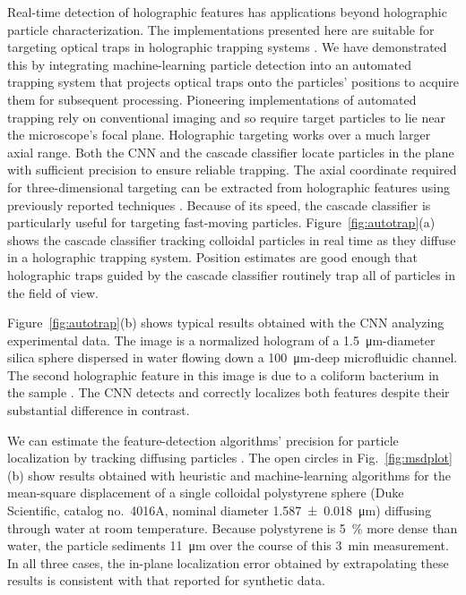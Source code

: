 Real-time detection of holographic features has applications
beyond holographic particle characterization.
The implementations presented here are suitable for targeting
optical traps in holographic trapping systems \cite{grier03}.
We have demonstrated this by integrating machine-learning
particle detection into an automated trapping system that
projects optical traps onto the particles' positions to acquire
them for subsequent processing.
Pioneering implementations
of automated trapping \cite{chapin06} rely on conventional
imaging and so require target particles to lie near the microscope's
focal plane.
Holographic targeting works over a much larger axial
range.
Both the CNN and the cascade classifier
locate particles in the plane with sufficient precision to ensure
reliable trapping.
The axial coordinate required for three-dimensional targeting can
be extracted from holographic features using previously reported
techniques \cite{yevick14}.
Because of its speed, the cascade classifier is particularly useful
for targeting fast-moving particles.
Figure~\ref{fig:autotrap}(a) shows the cascade classifier tracking colloidal
particles in real time as they diffuse in a holographic trapping
system.
Position estimates are good enough that holographic traps guided by the
cascade classifier routinely trap all of particles in the field of view.

Figure~\ref{fig:autotrap}(b) shows typical results obtained with
the CNN analyzing experimental data.  The image
is a normalized hologram of a
\SI{1.5}{\um}-diameter silica sphere dispersed in water
flowing down a \SI{100}{\um}-deep microfluidic channel.
The second holographic feature in this image is due
to a coliform bacterium in the sample \cite{philips17}.
The CNN detects and correctly localizes
both features despite their substantial
difference in contrast.

We can estimate the feature-detection algorithms' precision
for particle localization by tracking diffusing particles
\cite{crocker96}.
The open circles in Fig.~\ref{fig:msdplot}(b) show results obtained
with heuristic and machine-learning algorithms for the
mean-square displacement of a single colloidal polystyrene sphere
(Duke Scientific, catalog no.\ 4016A, nominal diameter
\SI{1.587+-0.018}{\um}) diffusing through water at
room temperature.
Because polystyrene is \SI{5}{\percent} more dense than water,
the particle sediments \SI{11}{\um} over the course of this
\SI{3}{\minute} measurement.
In all three cases, the in-plane localization error obtained
by extrapolating these results is consistent with that
reported for synthetic data.

